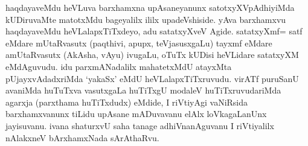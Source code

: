 
\begin{artha}
haqdayaveMdu heVLuva barxhamxna upAsaneyanunx satotxyXVpAdhiyiMda kUDiruvaMte matotxMdu bageyalilx ililx upadeVshiside. yAva barxhamxvu haqdayaveMdu heVLalapxTiTxdeyo, adu satatxyXveV Agide.  satatxyXmf= satf eMdare mUtaRvasutx (paqthivi, apupx, teVjasusxgaLu) tayxmf eMdare amUtaRvasutx (AkAsha, vAyu) ivugaLu, oTuTx kUDisi heVLidare satatxyXM eMdAguvudu. idu parxmANadalilx mahatetxMdU atayxMta pUjayxvAdadxriMda `yakaSx' eMdU heVLalapxTiTxruvudu. virATf puruSanU avaniMda huTuTxva vasutxgaLa huTiTxgU modaleV huTiTxruvudariMda agarxja (parxthama huTiTxdudx) eMdide, I riVtiyAgi vaNiRsida barxhamxvanunx tiLidu upAsane mADuvavanu elAlx loVkagaLanUnx jayisuvanu. ivana shaturxvU saha tanage adhiVnanAguvanu I riVtiyalilx nAlakxneV bArxhamxNada sArAthaRvu.
\end{artha}


